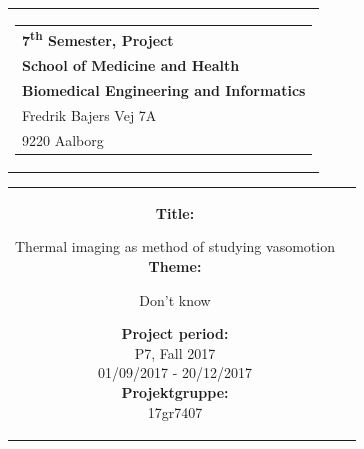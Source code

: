 % 
\thispagestyle{empty}
\begin{titlepage}
\begin{nopagebreak}
{\samepage 

\begin{tabular}{r}
\parbox{\textwidth}{  
\hfill \hspace{2cm} \parbox{8cm}{\begin{tabular}{l} %
{\small \textbf{\textcolor{aaublue}{{7\textsuperscript{th} Semester, Project}}}}\\
{\small \textbf{\textcolor{aaublue}{School of Medicine and Health}}}\\
{\small \textbf{\textcolor{aaublue}{Biomedical Engineering and Informatics}}}\\
{\small \textcolor{aaublue}{Fredrik Bajers Vej 7A}} \\
{\small \textcolor{aaublue}{9220 Aalborg}} \\
\end{tabular}}}
\end{tabular}

\begin{tabular}{cc}
\parbox{7cm}{

\textbf{Title:}

Thermal imaging as method of studying vasomotion\\ 

\textbf{Theme:}

\small{
Don't know\\
}


\parbox{8cm}{


\textbf{Project period:}\\
P7, Fall 2017\\
01/09/2017 - 20/12/2017\\
   
\textbf{Projektgruppe:}\\
17gr7407\\ %
  
}}
\end{tabular}}
\end{nopagebreak}
\end{titlepage}
